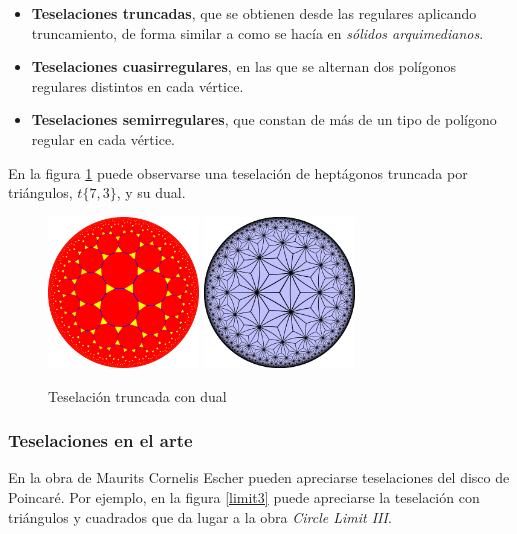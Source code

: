 \documentclass{article}
\theoremstyle{plain}
\theoremstyle{definition}
\theoremstyle{remark}
\begin{document}
\begin{itemize}
\item \textbf{Teselaciones truncadas}, que se obtienen desde las
  regulares aplicando truncamiento, de forma similar a como se hacía
  en \textit{sólidos arquimedianos}.
\item \textbf{Teselaciones cuasirregulares}, en las que se alternan
  dos polígonos regulares distintos en cada vértice.
\item \textbf{Teselaciones semirregulares}, que constan de más de un
  tipo de polígono regular en cada vértice.
\end{itemize}

En la figura \ref{tilingt7} puede observarse una teselación de heptágonos
truncada por triángulos, $t\{7,3\}$, y su dual.

\begin{figure}[ht!]
  \centering
  \includegraphics[width=40mm]{./tiling73t.png}
  \includegraphics[width=40mm]{./tiling73tdual.png}
  \caption{Teselación truncada con dual\label{tilingt7}}
\end{figure}

\subsubsection{Teselaciones en el arte}
En la obra de Maurits Cornelis Escher pueden apreciarse teselaciones
del disco de Poincaré. Por ejemplo, en la figura \ref{limit3} puede apreciarse
la teselación con triángulos y cuadrados que da lugar a la obra
\textit{Circle Limit III}.
\end{document}
